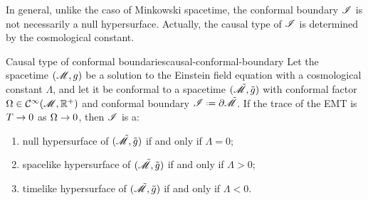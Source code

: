 In general, unlike the caso of Minkowski spacetime, the conformal boundary $ \mathscr{I} $ is not necessarily a null hypersurface. Actually, the causal type of $ \mathscr{I} $ is determined by the cosmological constant.

\begin{proposition}{Causal type of conformal boundaries}{causal-conformal-boundary}
  Let the spacetime $ (\mathscr{M} , g) $ be a solution to the Einstein field equation with a cosmological constant $ \Lambda $, and let it be conformal to a spacetime $ (\tilde{\mathscr{M}} , \tilde{g}) $ with conformal factor $ \Omega \in \mathcal{C}^{\infty}(\mathscr{M} , \mathbb{R}^+) $ and conformal boundary $ \scri \defeq \pa \tilde{\man} $. If the trace of the EMT is $ T \rightarrow 0 $ as $ \Omega \rightarrow 0 $, then $ \mathscr{I} $ is a:
  \begin{enumerate}
    \item null hypersurface of $ (\tilde{\mathscr{M}} , \tilde{g}) $ if and only if $ \Lambda = 0 $;
    \item spacelike hypersurface of $ (\tilde{\mathscr{M}} , \tilde{g}) $ if and only if $ \Lambda > 0 $;
    \item timelike hypersurface of $ (\tilde{\mathscr{M}} , \tilde{g}) $ if and only if $ \Lambda < 0 $.
  \end{enumerate}
\end{proposition}

